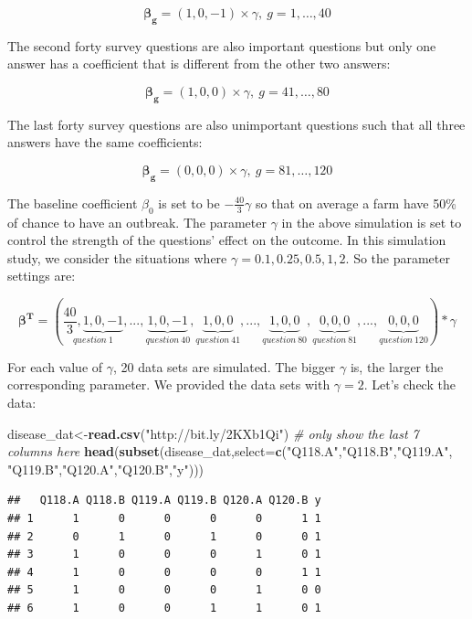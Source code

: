 \documentclass[12pt,]{krantz}
\makeatletter
\newenvironment{Shaded}{\begin{snugshade}}{\end{snugshade}}
\newcommand{\CommentTok}[1]{\textcolor[rgb]{0.37,0.37,0.37}{\textit{#1}}}
\newcommand{\DataTypeTok}[1]{\textcolor[rgb]{0.27,0.27,0.27}{#1}}
\newcommand{\KeywordTok}[1]{\textcolor[rgb]{0.27,0.27,0.27}{\textbf{#1}}}
\newcommand{\NormalTok}[1]{#1}
\newcommand{\StringTok}[1]{\textcolor[rgb]{0.5,0.5,0.5}{#1}}
\newenvironment{kframe}{%
\medskip{}
\setlength{\fboxsep}{.8em}
 \def\at@end@of@kframe{}%
 \ifinner\ifhmode%
  \def\at@end@of@kframe{\end{minipage}}%
  \begin{minipage}{\columnwidth}%
 \fi\fi%
 \def\FrameCommand##1{\hskip\@totalleftmargin \hskip-\fboxsep
 \colorbox{shadecolor}{##1}\hskip-\fboxsep
     \hskip-\linewidth \hskip-\@totalleftmargin \hskip\columnwidth}%
 \MakeFramed {\advance\hsize-\width
   \@totalleftmargin\z@ \linewidth\hsize
   \@setminipage}}%
 {\par\unskip\endMakeFramed%
 \at@end@of@kframe}
\renewenvironment{Shaded}{\begin{kframe}}{\end{kframe}}
\makeatother
\begin{document}
\[\mathbf{\beta_g}=(1,0,-1)\times \gamma,\ g=1,\dots,40\]

The second forty survey questions are also important questions but only one answer has a coefficient that is different from the other two answers:

\[\mathbf{\beta_g}=(1,0,0)\times \gamma,\ g=41,\dots,80\]

The last forty survey questions are also unimportant questions such that all three answers have the same coefficients:

\[\mathbf{\beta_g}=(0,0,0)\times \gamma,\ g=81,\dots,120\]

The baseline coefficient \(\beta_0\) is set to be \(-\frac{40}{3}\gamma\) so that on average a farm have 50\% of chance to have an outbreak. The parameter \(\gamma\) in the above simulation is set to control the strength of the questions' effect on the outcome. In this simulation study, we consider the situations where \(\gamma = 0.1, 0.25, 0.5, 1, 2\). So the parameter settings are:

\[\mathbf{\beta^{T}}=\left(\underset{question\ 1}{\frac{40}{3},\underbrace{1,0,-1}},...,\underset{question\ 40}{\underbrace{1,0,-1}},\underset{question\ 41}{\underbrace{1,0,0}},...,\underset{question\ 80}{\underbrace{1,0,0}},\underset{question\ 81}{\underbrace{0,0,0}},...,\underset{question\ 120}{\underbrace{0,0,0}}\right)*\gamma\]

For each value of \(\gamma\), 20 data sets are simulated. The bigger \(\gamma\) is, the larger the corresponding parameter. We provided the data sets with \(\gamma = 2\). Let's check the data:

\begin{Shaded}
\begin{Highlighting}[]
\NormalTok{disease_dat<-}\KeywordTok{read.csv}\NormalTok{(}\StringTok{"http://bit.ly/2KXb1Qi"}\NormalTok{)}
\CommentTok{# only show the last 7 columns here}
\KeywordTok{head}\NormalTok{(}\KeywordTok{subset}\NormalTok{(disease_dat,}\DataTypeTok{select=}\KeywordTok{c}\NormalTok{(}\StringTok{"Q118.A"}\NormalTok{,}\StringTok{"Q118.B"}\NormalTok{,}\StringTok{"Q119.A"}\NormalTok{,}
                                 \StringTok{"Q119.B"}\NormalTok{,}\StringTok{"Q120.A"}\NormalTok{,}\StringTok{"Q120.B"}\NormalTok{,}\StringTok{"y"}\NormalTok{))) }
\end{Highlighting}
\end{Shaded}

\begin{verbatim}
##   Q118.A Q118.B Q119.A Q119.B Q120.A Q120.B y
## 1      1      0      0      0      0      1 1
## 2      0      1      0      1      0      0 1
## 3      1      0      0      0      1      0 1
## 4      1      0      0      0      0      1 1
## 5      1      0      0      0      1      0 0
## 6      1      0      0      1      1      0 1
\end{verbatim}
\end{document}
